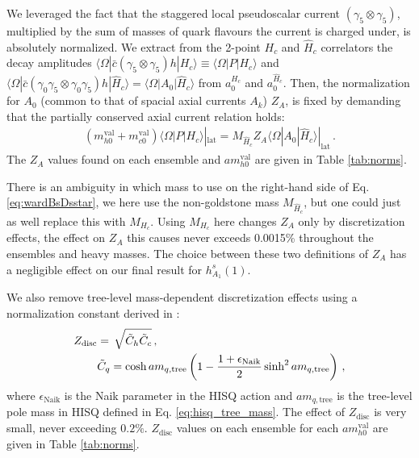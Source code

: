 We leveraged the fact that the staggered local pseudoscalar current $(\gamma_5\otimes \gamma_5)$, multiplied by the sum of masses of quark flavours the current is charged under, is absolutely normalized. We extract from the 2-point $H_c$ and $\hat{H}_c$ correlators the decay amplitudes $\langle \Omega | \bar{c} (\gamma_5\otimes \gamma_5) h | H_c \rangle \equiv \langle \Omega | P | H_c \rangle$ and $\langle \Omega | \bar{c} (\gamma_0\gamma_5 \otimes \gamma_0\gamma_5) h | \hat{H}_c \rangle = \langle \Omega | A_0 | \hat{H}_c \rangle$ from $a_0^{H_c}$ and $a_0^{\hat{H}_c}$. Then, the normalization for $A_0$ (common to that of spacial axial currents $A_k$) $Z_A$, is fixed by demanding that the partially conserved axial current relation holds:
\begin{align}
  (m^{\text{val}}_{h0} + m^{\text{val}}_{c0}) \langle \Omega | P | H_c \rangle|_{\text{lat}} = M_{\hat{H}_c} Z_A \langle \Omega | A_0 | \hat{H}_c \rangle|_{\text{lat}}\,.
  \label{eq:wardBsDsstar}
\end{align}
The $Z_A$ values found on each ensemble and $am^{\text{val}}_{h0}$ are given in Table \ref{tab:norms}.

There is an ambiguity in which mass to use on the right-hand side of Eq. \eqref{eq:wardBsDsstar}, we here use the non-goldstone mass $M_{\hat{H}_c}$, but one could just as well replace this with $M_{H_c}$. Using $M_{H_c}$ here changes $Z_A$ only by discretization effects, the effect on $Z_A$ this causes never exceeds 0.0015\% throughout the ensembles and heavy masses. The choice between these two definitions of $Z_A$ has a negligible effect on our final result for $h^s_{A_1}(1)$.

We also remove tree-level mass-dependent discretization effects using a normalization constant derived in \cite{Monahan:2012dq,Bazavov:2017lyh}:
\begin{align}
  \label{eq:Zdisc}
  Z_{\text{disc}} &=\,\sqrt{ \tilde{C}_h \tilde{C}_c }\,, \\
  \nonumber
  &\tilde{C}_q = \cosh am_{q,\text{tree}} \left( 1 - {1+\epsilon_{\text{Naik}}\over 2} \sinh^2 am_{q,\text{tree}} \right)\,,
\end{align}
where $\epsilon_{\text{Naik}}$ is the Naik parameter in the HISQ action and $am_{q,\text{tree}}$ is the tree-level pole mass in HISQ defined in Eq. \eqref{eq:hisq_tree_mass}. The effect of $Z_{\text{disc}}$ is very small, never exceeding $0.2\%$. $Z_{\text{disc}}$ values on each ensemble for each $am^{\text{val}}_{h0}$ are given in Table \ref{tab:norms}.

